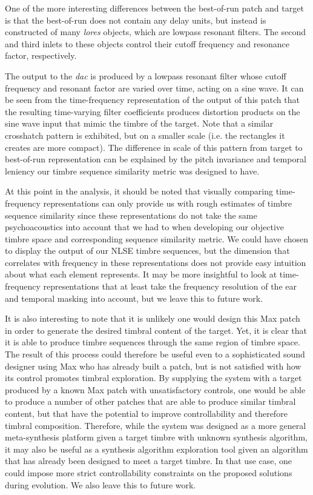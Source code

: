 \documentclass[a4paper,12pt]{report} 	%
\numberwithin{figure}{chapter}
\numberwithin{table}{chapter}
\numberwithin{equation}{chapter}
\begin{document}
\begin{flushleft}
One of the more interesting differences between the best-of-run patch and target is that the best-of-run does not contain any delay units, but instead is constructed of many \emph{lores\texttildelow{}} objects, which are lowpass resonant filters. The second and third inlets to these objects control their cutoff frequency and resonance factor, respectively.

The output to the \emph{dac\texttildelow{}} is produced by a lowpass resonant filter whose cutoff frequency and resonant factor are varied over time, acting on a sine wave. It can be seen from the time-frequency representation of the output of this patch that the resulting time-varying filter coefficients produces distortion products on the sine wave input that mimic the timbre of the target. Note that a similar crosshatch pattern is exhibited, but on a smaller scale (i.e. the rectangles it creates are more compact). The difference in scale of this pattern from target to best-of-run representation can be explained by the pitch invariance and temporal leniency our timbre sequence similarity metric was designed to have.

At this point in the analysis, it should be noted that visually comparing time-frequency representations can only provide us with rough estimates of timbre sequence similarity since these representations do not take the same psychoacoustics into account that we had to when developing our objective timbre space and corresponding sequence similarity metric. We could have chosen to display the output of our NLSE timbre sequences, but the dimension that correlates with frequency in these representations does not provide easy intuition about what each element represents. It may  be more insightful to look at time-frequency representations that at least take the frequency resolution of the ear and temporal masking into account, but we leave this to future work.

It is also interesting to note that it is unlikely one would design this Max patch in order to generate the desired timbral content of the target. Yet, it is clear that it is able to produce timbre sequences through the same region of timbre space. The result of this process could therefore be useful even to a sophisticated sound designer using Max who has already built a patch, but is not satisfied with how its control promotes timbral exploration. By supplying the system with a target produced by a known Max patch with unsatisfactory controls, one would be able to produce a number of other patches that are able to produce similar timbral content, but that have the potential to improve controllability and therefore timbral composition. Therefore, while the system was designed as a more general meta-synthesis platform given a target timbre with unknown synthesis algorithm, it may also be useful as a synthesis algorithm exploration tool given an algorithm that has already been designed to meet a target timbre. In that use case, one could impose more strict controllability constraints on the proposed solutions during evolution. We also leave this to future work.


\end{flushleft}
\end{document}
